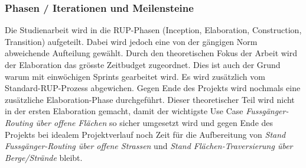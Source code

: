 \subsubsection{Phasen / Iterationen und Meilensteine}
\label{sub:Phasen / Iterationen und Meilensteine}

Die Studienarbeit wird in die \ac{RUP}-Phasen (Inception, Elaboration, Construction, Transition) aufgeteilt. Dabei wird jedoch eine von der gängigen Norm abweichende Aufteilung gewählt. Durch den theoretischen Fokus der Arbeit wird der Elaboration das grösste Zeitbudget zugeordnet. Dies ist auch der Grund warum mit einwöchigen Sprints gearbeitet wird. Es wird zusätzlich vom Standard-\ac{RUP}-Prozess abgewichen. Gegen Ende des Projekts wird nochmals eine zusätzliche Elaboration-Phase durchgeführt. Dieser theoretischer Teil wird nicht in der ersten Elaboration gemacht, damit der wichtigste Use Case \textit{Fussgänger-Routing über offene Flächen} so sicher umgesetzt wird und gegen Ende des Projekts bei idealem Projektverlauf noch Zeit für die Aufbereitung von \textit{Stand Fussgänger-Routing über offene Strassen} und \textit{Stand Flächen-Traversierung über Berge/Strände} bleibt.

